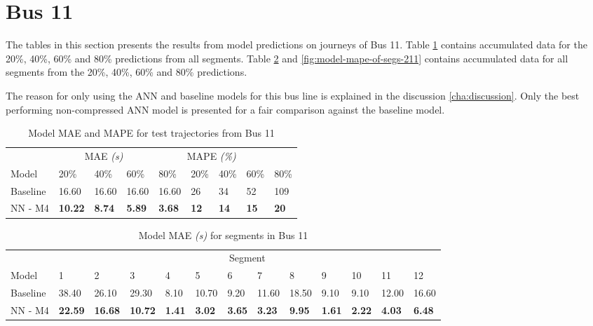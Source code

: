 \section{Bus 11}
The tables in this section presents the results from model predictions on journeys of Bus 11. Table \ref{tbl:models-mae-and-mape-211} contains accumulated data for the 20\%, 40\%, 60\% and 80\% predictions from all segments. Table \ref{tbl:model-mae-of-segs-211} and \ref{fig:model-mape-of-segs-211} contains accumulated data for all segments from the 20\%, 40\%, 60\% and 80\% predictions.

The reason for only using the ANN and baseline models for this bus line is explained in the discussion \ref{cha:discussion}. Only the best performing non-compressed ANN model is presented for a fair comparison against the baseline model.
\begin{table}[H]
	\centering
	\caption{Model MAE and MAPE for test trajectories from Bus 11}
	\label{tbl:models-mae-and-mape-211}
	\begin{tabular}{l | l | l | l | l || l | l | l | l }
		& \multicolumn{3}{c}{MAE \textit{(s)}} & \multicolumn{4}{c}{MAPE \textit{(\%)}} \\
		Model      & 20\% & 40\% & 60\% & 80\% & 20\% & 40\% & 60\% & 80\% \\
		\hline
		Baseline & 16.60 & 16.60 & 16.60 & 16.60  & 26 & 34 & 52 & 109 \\
		NN - M4        & \textbf{10.22}& \textbf{8.74}& \textbf{5.89}& \textbf{3.68}& \textbf{12}& \textbf{14}& \textbf{15}& \textbf{20} \\
	\end{tabular}
\end{table}

\begin{table}[H]
	\centering
	\caption{Model MAE \textit{(s)} for segments in Bus 11}
	\label{tbl:model-mae-of-segs-211}
	\begin{adjustbox}{center}
	\begin{tabular}{ l | l | l | l | l | l | l | l | l | l | l | l | l}
		& \multicolumn{12}{c}{Segment} \\
		Model       & 1 & 2 & 3 & 4 & 5 & 6 & 7 & 8 & 9 & 10 & 11 & 12 \\
		\hline
		Baseline  & 38.40 & 26.10 & 29.30 & 8.10 & 10.70 & 9.20 & 11.60 & 18.50 & 9.10 & 9.10  & 12.00 & 16.60 \\
		NN - M4         & \textbf{22.59}& \textbf{16.68}& \textbf{10.72}& \textbf{1.41}& \textbf{3.02}& \textbf{3.65}& \textbf{3.23}& \textbf{9.95}& \textbf{1.61}& \textbf{2.22}& \textbf{4.03}& \textbf{6.48}\\
	\end{tabular}
	\end{adjustbox}
\end{table}

